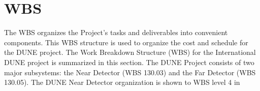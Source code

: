 \section[Work Breakdown Structure (WBS)]{WBS}

The WBS organizes the Project's tasks and deliverables into convenient components. 
This WBS structure is used to organize the cost and schedule for the DUNE project.
The Work Breakdown Structure (WBS) for the International DUNE project is summarized
in this section.
The DUNE Project consists of two major subsystems: the Near Detector (WBS 130.03) and
the Far Detector (WBS 130.05).
The DUNE Near Detector organization is shown to WBS level 4 in 
